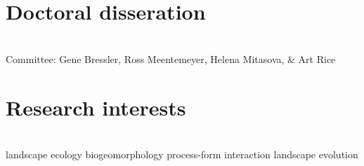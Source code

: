 \documentclass[]{baharmon_cv}
\begin{document}


\sectiondivider




\section{Doctoral disseration}
\vspace*{0.1cm}
\\ 
Committee:  Gene Bressler, Ross Meentemeyer, Helena Mitasova, \& Art Rice
\sectiondivider


\section{Research interests}

\vspace*{0.2cm}
 \\ \vspace*{0.1cm}
\normalsize{
landscape ecology \textbullet{} biogeomorphology \textbullet{} process-form interaction \textbullet{} landscape evolution}
\\
\vspace*{0.2cm}
\end{document}
